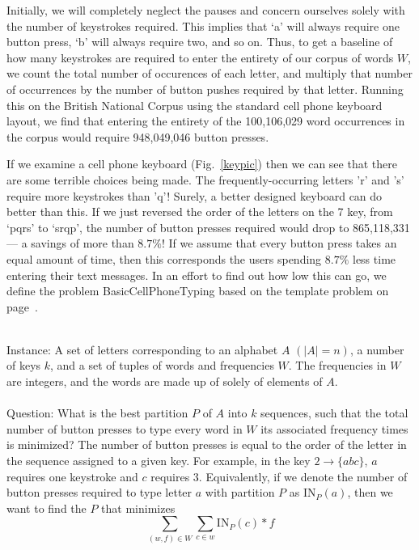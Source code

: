 \documentclass[runningheads]{llncs}
\begin{document}
Initially, we will completely neglect the pauses and concern ourselves solely
with the number of keystrokes required.  This implies that `a' will always
require one button press, `b' will always require two, and so on.  Thus, to get
a baseline of how many keystrokes are required to enter the entirety of our
corpus of words $W$, we count the total number of occurences of each letter,
and multiply that number of occurrences by the number of button pushes
required by that letter.  Running this on the British National Corpus
using the standard cell phone keyboard layout, we find that entering the
entirety of the 100,106,029 word occurrences in the corpus would require
948,049,046 button presses.  

If we examine a cell phone keyboard (Fig.~\ref{keypic}) then we can see that
there are some terrible choices being made.  The frequently-occurring letters
'r' and 's' require more keystrokes than 'q'!  Surely, a better designed
keyboard can do better than this.  If we just reversed the order of the letters
on the 7 key, from `pqrs' to `srqp', the number of button presses required
would drop to 865,118,331 --- a savings of more than $8.7\%$!  If we assume
that every button press takes an equal amount of time, then this corresponds
the users spending $8.7\%$ less time entering their text messages.  In an
effort to find out how low this can go, we define the problem {\sc
BasicCellPhoneTyping} based on the template problem on
page~\pageref{probtemplate}.

\begin{prob}[{\sc BasicCellPhoneTyping}]~\\
{\sc Instance}: A set of letters corresponding to an alphabet $A$ $(|A| =
n)$, a number of keys $k$, and a set of
tuples of words and frequencies $W$.  The frequencies in $W$ are integers,
and the words are made up of solely of elements of $A$. \\
        ~\\
{\sc Question}: What is the best partition $P$ of $A$ into $k$ sequences, such
that the total number of button presses to type every word in $W$ its
associated frequency times is minimized?  The number of button presses is equal
to the order of the letter in the sequence assigned to a given key.  For
example, in the key $2\to\{abc\}$, $a$ requires one keystroke and $c$ requires
3.  Equivalently, if we denote the number of button presses required to type
letter $a$ with partition $P$ as $\mathrm{IN}_P(a)$, then we want to find the $P$ that
minimizes $$\sum_{(w,f) \in W}\sum_{c\in w} \mathrm{IN}_P(c) * f$$
\label{bcpt}
\end{prob}
\end{document}
